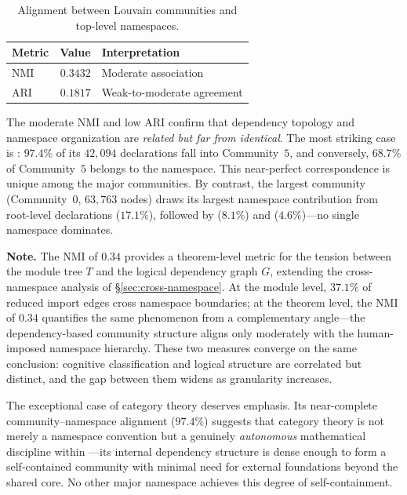 \begin{table}[ht]
\centering
\caption{Alignment between Louvain communities and top-level namespaces.}
\label{tab:thm-nmi}
\begin{tabular}{lrl}
\toprule
Metric & Value & Interpretation \\
\midrule
NMI & $0.3432$ & Moderate association \\
ARI & $0.1817$ & Weak-to-moderate agreement \\
\bottomrule
\end{tabular}
\end{table}

The moderate NMI and low ARI confirm that dependency topology and namespace organization are \emph{related but far from identical}. The most striking case is : $97.4\%$ of its $42{,}094$ declarations fall into Community~$5$, and conversely, $68.7\%$ of Community~$5$ belongs to the  namespace. This near-perfect correspondence is unique among the major communities. By contrast, the largest community (Community~$0$, $63{,}763$ nodes) draws its largest namespace contribution from root-level declarations ($17.1\%$), followed by  ($8.1\%$) and  ($4.6\%$)---no single namespace dominates.

\noindent\textbf{Note.}
\label{rem:nmi-tension}
The NMI of $0.34$ provides a theorem-level metric for the tension between the module tree $T$ and the logical dependency graph $G$, extending the cross-namespace analysis of \S\ref{sec:cross-namespace}. At the module level, $37.1\%$ of reduced import edges cross namespace boundaries; at the theorem level, the NMI of $0.34$ quantifies the same phenomenon from a complementary angle---the dependency-based community structure aligns only moderately with the human-imposed namespace hierarchy. These two measures converge on the same conclusion: cognitive classification and logical structure are correlated but distinct, and the gap between them widens as granularity increases.

The exceptional case of category theory deserves emphasis. Its near-complete community--namespace alignment ($97.4\%$) suggests that category theory is not merely a namespace convention but a genuinely \emph{autonomous} mathematical discipline within ---its internal dependency structure is dense enough to form a self-contained community with minimal need for external foundations beyond the shared core. No other major namespace achieves this degree of self-containment.

